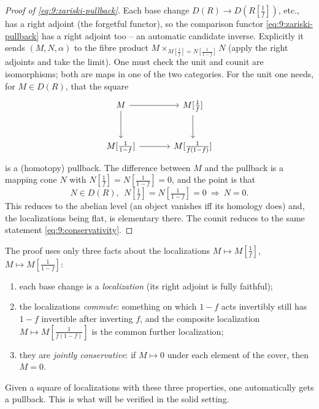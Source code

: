 \begin{proof}[Proof of \eqref{eq:9:zariski-pullback}]
Each base change $D(R)\to D(R[\tfrac1f])$, etc., has a right adjoint (the
forgetful functor), so the comparison functor
\eqref{eq:9:zariski-pullback} has a right adjoint too -- an automatic candidate
inverse. Explicitly it sends $(M,N,\alpha)$ to the fibre product $M\times_{M[
\frac1f]=N[\frac1{1-f}]}N$ (apply the right adjoints and take the limit). One
must check the unit and counit are isomorphisms; both are maps in one of the two
categories. For the unit one needs, for $M\in D(R)$, that the square
\begin{equation*}
\begin{tikzcd}[column sep=large, row sep=large]
M \arrow[r] \arrow[d] & M[\tfrac1f] \arrow[d] \\
M[\tfrac1{1-f}] \arrow[r] & M[\tfrac1{f(1-f)}]
\end{tikzcd}
\end{equation*}
is a (homotopy) pullback. The difference between $M$ and the pullback is a
mapping cone $N$ with $N[\tfrac1f]=N[\tfrac1{1-f}]=0$, and the point is that
\begin{equation}
\label{eq:9:conservativity}
N\in D(R),\ \ N[\tfrac1f]=N[\tfrac1{1-f}]=0\ \Longrightarrow\ N=0.
\end{equation}
This reduces to the abelian level (an object vanishes iff its homology does) and,
the localizations being flat, is elementary there. The counit reduces to the
same statement \eqref{eq:9:conservativity}.
\end{proof}

\begin{remark}
\label{rmk:9:three-ingredients}
The proof uses only three facts about the localizations $M\mapsto M[\tfrac1f]$,
$M\mapsto M[\tfrac1{1-f}]$:
\begin{enumerate}
\item each base change is a \emph{localization} (its right adjoint is fully
faithful);
\item the localizations \emph{commute}: something on which $1-f$ acts invertibly
still has $1-f$ invertible after inverting $f$, and the composite localization
$M\mapsto M[\tfrac1{f(1-f)}]$ is the common further localization;
\item they are \emph{jointly conservative}: if $M\mapsto 0$ under each element of
the cover, then $M=0$.
\end{enumerate}
Given a square of localizations with these three properties, one automatically
gets a pullback. This is what will be verified in the solid setting.
\end{remark}

